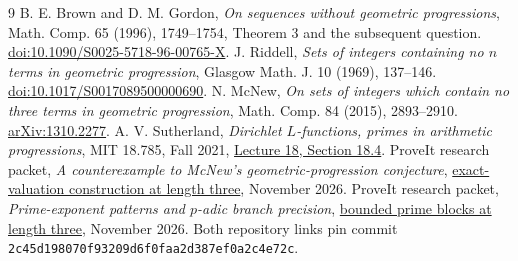 \documentclass[11pt]{article}
\newcommand{\pgref}[2]{\href{https://github.com/VladimirReshetnikov/ProveIt/blob/2c45d198070f93209d6f0faa2d387ef0a2c4e72c/Analysis/GeneralizedRiemannHypothesis/Research/#1}{#2}}
\begin{document}
\begingroup\small\raggedright
\begin{thebibliography}{9}
 B. E. Brown and D. M. Gordon, \emph{On sequences without geometric progressions}, Math. Comp. 65 (1996), 1749--1754, Theorem 3 and the subsequent question.
\href{https://doi.org/10.1090/S0025-5718-96-00765-X}{doi:10.1090/S0025-5718-96-00765-X}.
 J. Riddell, \emph{Sets of integers containing no $n$ terms in geometric progression}, Glasgow Math. J. 10 (1969), 137--146.
\href{https://doi.org/10.1017/S0017089500000690}{doi:10.1017/S0017089500000690}.
 N. McNew, \emph{On sets of integers which contain no three terms in geometric progression}, Math. Comp. 84 (2015), 2893--2910.
\href{https://arxiv.org/abs/1310.2277}{arXiv:1310.2277}.
 A. V. Sutherland, \emph{Dirichlet $L$-functions, primes in arithmetic progressions}, MIT 18.785, Fall 2021, \href{https://math.mit.edu/classes/18.785/2021fa/LectureNotes18.pdf}{Lecture 18, Section 18.4}.
 ProveIt research packet, \emph{A counterexample to McNew's geometric-progression conjecture}, \pgref{mcnew_counterexample_and_grh_transfers/rankin.tex}{exact-valuation construction at length three}, November 2026.
 ProveIt research packet, \emph{Prime-exponent patterns and $p$-adic branch precision}, \pgref{grh_prime_patterns_and_branch_precision/prime_blocks.tex}{bounded prime blocks at length three}, November 2026. Both repository links pin commit \texttt{2c45d198070f93209d6f0faa2d387ef0a2c4e72c}.
\end{thebibliography}
\endgroup
\end{document}
